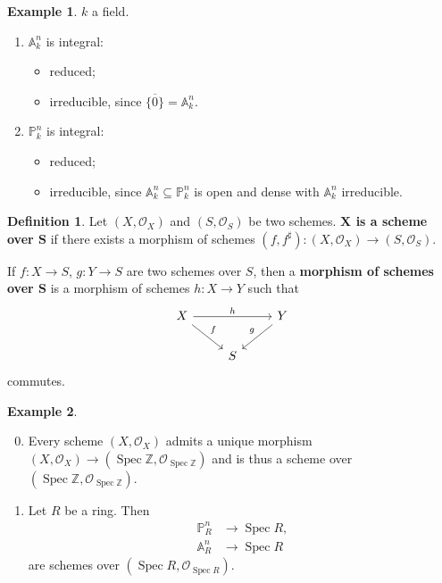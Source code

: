 \documentclass[12pt]{article}
\DeclareMathOperator{\Spec}{Spec}
\theoremstyle{definition}
\newtheorem*{definition}{Definition}
\newtheorem*{example}{Example}
\begin{document}
\begin{example}
$k$ a field.
\begin{enumerate}[label=\arabic*)]
\item $\mathbb A_k^n$ is integral:
\begin{itemize}[label=$-$]
\item reduced;
\item irreducible, since $\overline{\{0\}}=\mathbb A_k^n$.
\end{itemize}

\item $\mathbb P_k^n$ is integral:
\begin{itemize}[label=$-$]
\item reduced;
\item irreducible, since $\mathbb A_k^n\subseteq\mathbb P_k^n$ is open and dense with $\mathbb A_k^n$ irreducible.
\end{itemize}
\end{enumerate}
\end{example}

\begin{definition}
Let $(X,\mathcal O_X)$ and $(S,\mathcal O_S)$ be two schemes. \textbf{$\boldsymbol X$ is a scheme over $\boldsymbol S$} if there exists a morphism of schemes $(f,f^\sharp):(X,\mathcal O_X)\rightarrow(S,\mathcal O_S)$.

If $f:X\rightarrow S$, $g:Y\rightarrow S$ are two schemes over $S$, then a \textbf{morphism of schemes over $\boldsymbol S$} is a morphism of schemes $h:X\rightarrow Y$ such that
\[\begin{tikzcd}X\arrow[rr,"h"]\arrow[rd,"f"]&&Y\arrow[dl,"g",swap]\\&S\end{tikzcd}\]
commutes.
\end{definition}

\begin{example}
\begin{enumerate}[label=\arabic*)]
\setcounter{enumi}{-1}
\item Every scheme $(X,\mathcal O_X)$ admits a unique morphism $(X,\mathcal O_X)\rightarrow(\Spec\mathbb Z,\mathcal O_{\Spec\mathbb Z})$ and is thus a scheme over $(\Spec\mathbb Z,\mathcal O_{\Spec\mathbb Z})$.

\item Let $R$ be a ring. Then
\begin{align*}
\mathbb P_R^n&\longrightarrow\Spec R,\\\mathbb A_R^n&\longrightarrow\Spec R
\end{align*}
are schemes over $(\Spec R,\mathcal O_{\Spec R})$.
\end{enumerate}
\end{example}
\end{document}
